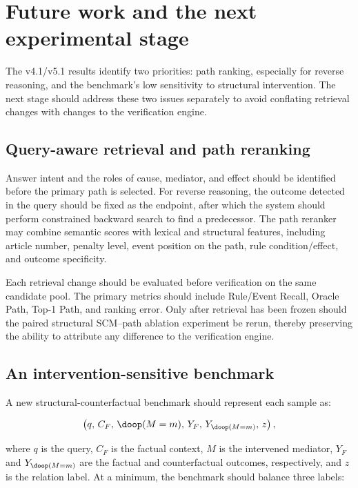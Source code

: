 \section{Future work and the next experimental stage}
\label{sec:future}

The v4.1/v5.1 results identify two priorities: path ranking, especially for
reverse reasoning, and the benchmark's low sensitivity to structural
intervention. The next stage should address these two issues separately to
avoid conflating retrieval changes with changes to the verification engine.

\subsection{Query-aware retrieval and path reranking}

Answer intent and the roles of cause, mediator, and effect should be
identified before the primary path is selected. For reverse reasoning, the
outcome detected in the query should be fixed as the endpoint, after which
the system should perform constrained backward search to find a predecessor.
The path reranker may combine semantic scores with lexical and structural
features, including article number, penalty level, event position on the
path, rule condition/effect, and outcome specificity.

Each retrieval change should be evaluated before verification on the same
candidate pool. The primary metrics should include Rule/Event Recall, Oracle
Path, Top-1 Path, and ranking error. Only after retrieval has been frozen
should the paired structural SCM--path ablation experiment be rerun, thereby
preserving the ability to attribute any difference to the verification
engine.

\subsection{An intervention-sensitive benchmark}

A new structural-counterfactual benchmark should represent each sample as:

\begin{equation}
\left(
q,\,
C_F,\,
\doop(M=m),\,
Y_F,\,
Y_{\doop(M=m)},\,
z
\right),
\label{eq:future-counterfactual-item}
\end{equation}

where $q$ is the query, $C_F$ is the factual context, $M$ is the intervened
mediator, $Y_F$ and $Y_{\doop(M=m)}$ are the factual and counterfactual
outcomes, respectively, and $z$ is the relation label. At a minimum, the
benchmark should balance three labels:

